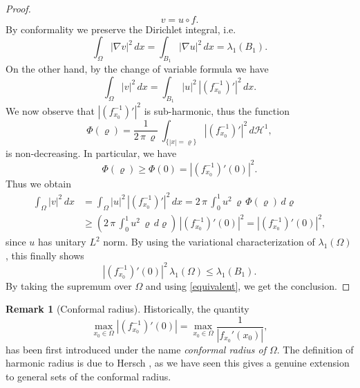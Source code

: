 \documentclass{amsart}
\theoremstyle{definition}
\newtheorem{remark}[lemma]{Remark}
\numberwithin{equation}{section}
\begin{document}
\begin{proof}
\[
v=u\circ f.
\]
By conformality we preserve the Dirichlet integral, i.e.
\[
\int_\Omega |\nabla v|^2\,dx=\int_{B_1} |\nabla u|^2\,dx=\lambda_1(B_1).
\]
On the other hand, by the change of variable formula we have
\[
\int_\Omega |v|^2\,dx=\int_{B_1} |u|^2\,|(f^{-1}_{x_0})'|^2\,dx.
\]
We now observe that $|(f^{-1}_{x_0})'|^2$ is sub-harmonic, thus the function
\begin{equation}
\label{subarmo}
\Phi(\varrho)=\frac{1}{2\,\pi\,\varrho}\,\int_{\{|x|=\varrho\}} |(f^{-1}_{x_0})'|^2\,d\mathcal{H}^1,
\end{equation}
is non-decreasing. In particular, we have
\[
\Phi(\varrho)\ge \Phi(0)=|(f^{-1}_{x_0})'(0)|^2.
\]
Thus we obtain
\[
\begin{split}
\int_\Omega |v|^2\,dx&=\int_\Omega |u|^2\,|(f^{-1}_{x_0})'|^2\,dx=2\,\pi\,\int_0^1 u^2\,\varrho\,\Phi(\varrho)\,d\varrho\\
&\ge \left(2\,\pi\,\int_0^1 u^2\,\varrho\,d\varrho\right)\,|(f^{-1}_{x_0})'(0)|^2=|(f^{-1}_{x_0})'(0)|^2,
\end{split}
\]
since $u$ has unitary $L^2$ norm.
By using the variational characterization of $\lambda_1(\Omega)$, this finally shows
\[
|(f^{-1}_{x_0})'(0)|^2\,\lambda_1(\Omega)\le \lambda_1(B_1).
\]
By taking the supremum over $\Omega$ and using \eqref{equivalent}, we get the conclusion.
\end{proof}
\begin{remark}[Conformal radius]
Historically, the quantity 
\[
\max_{x_0\in\Omega} \left|(f_{x_0}^{-1})'(0)\right|=\max_{x_0\in\Omega} \frac{1}{|f_{x_0}'(x_0)|},
\]
has been first introduced under the name {\it conformal radius of $\Omega$}. The definition of harmonic radius is due to Hersch \cite{MR0247572}, as we have seen this gives a genuine extension to general sets of the conformal radius.
\end{remark}
\end{document}
